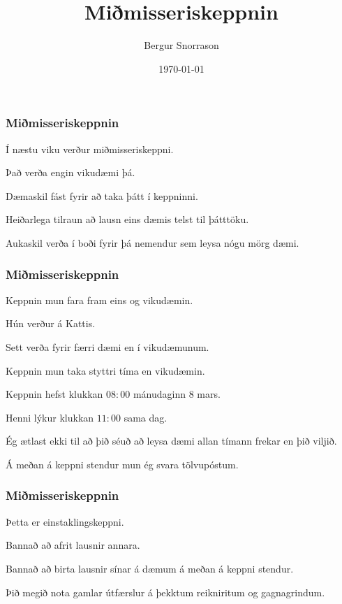 \title{Miðmisseriskeppnin}
\author{Bergur Snorrason}
\date{\today}



\frame{\titlepage}

{
	\frametitle{Miðmisseriskeppnin}
	{
		\item<1-> Í næstu viku verður miðmisseriskeppni.
		\item<2-> Það verða engin vikudæmi þá.
		\item<3-> Dæmaskil fást fyrir að taka þátt í keppninni.
		\item<4-> Heiðarlega tilraun að lausn eins dæmis telst til þátttöku.
		\item<5-> Aukaskil verða í boði fyrir þá nemendur sem leysa nógu mörg dæmi.
	}
}

{
	\frametitle{Miðmisseriskeppnin}
	{
		\item<1-> Keppnin mun fara fram eins og vikudæmin.
		\item<2-> Hún verður á Kattis.
		\item<3-> Sett verða fyrir færri dæmi en í vikudæmunum.
		\item<4-> Keppnin mun taka styttri tíma en vikudæmin.
		\item<5-> Keppnin hefst klukkan $08:00$ mánudaginn $8$ mars.
		\item<6-> Henni lýkur klukkan $11:00$ sama dag.
		\item<7-> Ég ætlast ekki til að þið séuð að leysa dæmi allan tímann frekar en þið viljið.
		\item<8-> Á meðan á keppni stendur mun ég svara tölvupóstum.
	}
}

{
	\frametitle{Miðmisseriskeppnin}
	{
		\item<1-> Þetta er einstaklingskeppni.
		\item<2-> Bannað að afrit lausnir annara.
		\item<3-> Bannað að birta lausnir sínar á dæmum á meðan á keppni stendur.
		\item<4-> Þið megið nota gamlar útfærslur á þekktum reikniritum og gagnagrindum.
	}
}

{
}


